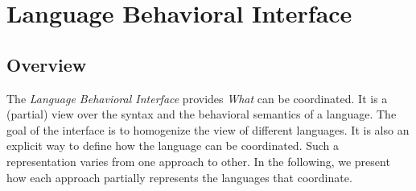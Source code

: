 \section{Language Behavioral Interface}
	\subsection{Overview}
The \emph{Language Behavioral Interface} provides \emph{What} can be coordinated. It is a (partial) view over the syntax and the behavioral semantics of a language. The goal of the interface is to homogenize the view of different languages. It is also an explicit way to define how the language can be coordinated. Such a representation varies from one approach to other. In the following, we present how each approach partially represents the languages that coordinate.

